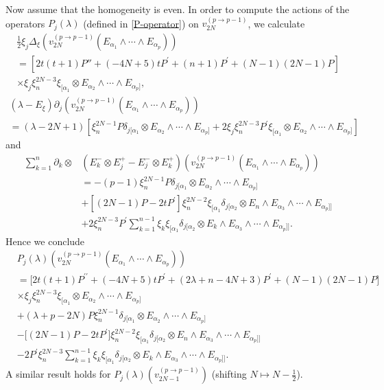\documentclass[a4paper,12pt,reqno]{amsart}
\numberwithin{theorem}{subsection}
\numberwithin{equation}{section}
\begin{document}
Now assume that the homogeneity is even. In order to compute the actions of the
operators $P_j(\lambda)$ (defined in \eqref{P-operator}) on $v_{2N}^{(p\to
p-1)}$, we calculate
\begin{multline*}
   \tfrac{1}{2} \xi_j \Delta_\xi (v_{2N}^{(p\to p-1)}(E_{\alpha_1} \wedge \cdots \wedge E_{\alpha_p})) \\
   = \left[2t(t\!+\!1)P'' + (-4N\!+\!5) tP^\prime + (n\!+\!1) P^\prime + (N\!-\!1)(2N\!-\!1) P\right] \\
   \times \xi_j \xi_n^{2N-3} \xi_{[\alpha_1}\otimes E_{\alpha_2}\wedge\cdots\wedge E_{\alpha_p]},
\end{multline*}
\begin{multline*}
   (\lambda-E_\xi)\partial_j(v_{2N}^{(p\to  p-1)}(E_{\alpha_1} \wedge \cdots \wedge E_{\alpha_p})) \\
   = (\lambda\!-\!2N\!+\!1) \left[\xi_n^{2N-1} P\delta_{j[\alpha_1}\otimes E_{\alpha_2}
   \wedge \cdots \wedge E_{\alpha_p]}
   + 2\xi_j \xi_n^{2N-3} P^{\prime} \xi_{[\alpha_1} \otimes E_{\alpha_2} \wedge \cdots \wedge E_{\alpha_p]}\right]
\end{multline*}
and
\begin{align*}
    \sum_{k=1}^{n} \partial_k \otimes & (E^-_k\otimes E^+_j- E_j^- \otimes E_k^+)
    (v_{2N}^{(p\to p-1)}(E_{\alpha_1} \wedge \cdots \wedge E_{\alpha_p})) \\
    & = -(p\!-\!1)\xi_n^{2N-1}P  \delta_{j[\alpha_1}\otimes E_{\alpha_2}\wedge\cdots\wedge E_{\alpha_p]}\\
    & + \left[(2N\!-\!1)P - 2t P^\prime\right] \xi_n^{2N-2}\xi_{[\alpha_1}\delta_{j[\alpha_2} \otimes
    E_n \wedge E_{\alpha_3}\wedge\cdots\wedge E_{\alpha_p]]}\\
    & + 2 \xi_n^{2N-3} P^\prime \sum_{k=1}^{n-1} \xi_k \xi_{[\alpha_1}\delta_{j[\alpha_2}
    \otimes E_k \wedge E_{\alpha_3} \wedge \cdots\wedge E_{\alpha_p]]}.
\end{align*}
Hence we conclude
\begin{align*}
    & P_j(\lambda)(v_{2N}^{(p\to  p-1)}(E_{\alpha_1} \wedge \cdots \wedge E_{\alpha_p})) \\
    & = \big [2t(t\!+\!1)P^{\prime\prime} + (-4N\!+\!5) t P^\prime + (2\lambda\!+\!n\!-\!4N\!+\!3)P^\prime
    + (N\!-\!1)(2N\!-\!1)P\big] \\
    & \times \xi_j\xi_n^{2N-3}\xi_{[\alpha_1}\otimes E_{\alpha_2}\wedge\cdots\wedge E_{\alpha_p]} \\
    & + (\lambda\!+\!p\!-\!2N)P \xi_n^{2N-1}\delta_{j[\alpha_1}\otimes E_{\alpha_2}\wedge\cdots\wedge E_{\alpha_p]}\\
    & - \big[(2N\!-\!1)P - 2t P^\prime\big] \xi_n^{2N-2}\xi_{[\alpha_1}\delta_{j[\alpha_2}
       \otimes E_n\wedge E_{\alpha_3}\wedge\cdots\wedge E_{\alpha_p]]}\\
    & - 2P^\prime \xi_n^{2N-3} \sum_{k=1}^{n-1}\xi_k \xi_{[\alpha_1}\delta_{j[\alpha_2}
       \otimes E_k\wedge E_{\alpha_3}\wedge\cdots\wedge E_{\alpha_p]]}.
\end{align*}
A similar result holds for $P_j(\lambda)(v_{2N-1}^{(p\to  p-1)})$ (shifting $N
\mapsto N-\frac 12$).
\end{document}
